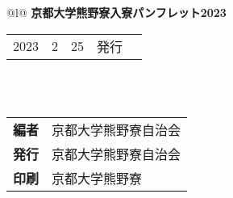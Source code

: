 
\vspace*{\fill} %


\begin{flushleft}
  \begin{tabular*}{\textwidth}{@{}l@{\extracolsep{\fill}}}
      \textbf{\huge 京都大学熊野寮入寮パンフレット2023} \\
      \hline
      \begin{tabular}{@{}r@{年\kern.5zw}r@{月\kern.5zw}r@{日\kern1.5zw}ll}
          2023 &  2 & 25 & 発行 & \\
      \end{tabular} \\
      \\
      \begin{tabular}{@{}l@{\kern.5zw\textbf{:}\kern1zw}l}
          \textbf{編者} & 京都大学熊野寮自治会 \\
          \textbf{発行} & 京都大学熊野寮自治会 \\
          \textbf{印刷} & 京都大学熊野寮 \\
      \end{tabular} \\
      \hline
  \end{tabular*}
\end{flushleft}